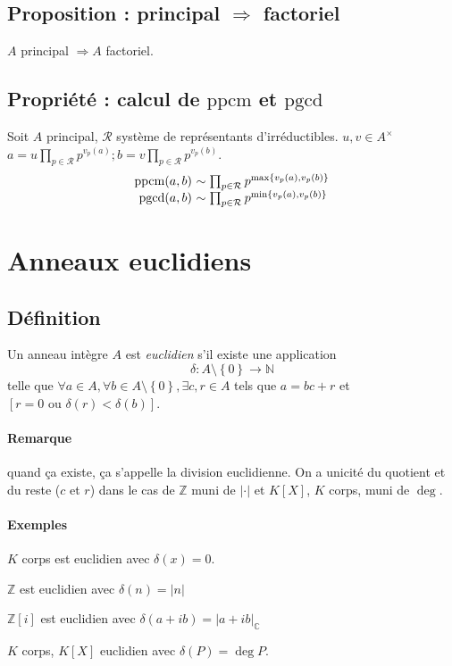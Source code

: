 \documentclass[reqno,a4paper,10pt]{report}
\makeatletter
\newcommand{\set}[1]{\left\lbrace #1 \right\rbrace} %
\newcommand{\IZ}{\ensuremath{\mathbb{Z}}\xspace} %
\newcommand{\IN}{\ensuremath{\mathbb{N}}\xspace} %
\newcommand{\IC}{\ensuremath{\mathbb{C}}\xspace} %
\newcommand{\so}{\Rightarrow}
\newcommand{\pgcd}{\mathrm{pgcd}} %
\newcommand{\ppcm}{\mathrm{ppcm}}
\newcommand{\ou}{\text{ ou }}
\let\olditemize=\itemize%
\renewenvironment{itemize}{%
    \olditemize%
  }{%
    \@noparlisttrue%
    \endlist%
  }%
\makeatother
\begin{document}
\subsection{Proposition : principal $\so$ factoriel}
$A$ principal $\so A$ factoriel.

\begin{comment}
  Preuve 02/12/09 p1
\end{comment}

\subsection{Propriété : calcul de $\ppcm$ et $\pgcd$}
Soit $A$ principal, $\mathcal R$ système de représentants d'irréductibles.
$u,v\in A^\times$\\
$\displaystyle a=u\prod_{p\in \mathcal R} p^{v_p(a)}; b=v\prod_{p\in \mathcal
R} p^{v_p(b)}$.
\[
\begin{array}{r@{\ }l}
  \ppcm(a,b) &\sim \prod_{p\in \mathcal R} p^{\max\set{v_p(a), v_p(b)}}\\
  \pgcd(a,b) &\sim \prod_{p\in \mathcal R} p^{\min\set{v_p(a), v_p(b)}}
\end{array}
\]

\section{Anneaux euclidiens}
\subsection{Définition}
Un anneau intègre $A$ est \emph{euclidien} s'il existe une application
\[\delta : A\setminus\set{0} \to \IN\]
telle que $\forall a\in A, \forall b \in A\setminus\set{0}, \exists c,r \in A$
tels que $a=bc+r$ et $\left[ r=0 \ou \delta(r) <\delta(b) \right]$.

\paragraph{Remarque}
quand ça existe, ça s'appelle la division euclidienne. On a unicité du
quotient et du reste ($c$ et $r$) dans le cas de $\IZ$ muni de $|\cdot|$
et $K[X]$, $K$ corps, muni de $\deg$.

\paragraph{Exemples}
\begin{itemize}
  \item $K$ corps est euclidien avec $\delta(x) = 0$.
  \item $\IZ$ est euclidien avec $\delta(n)=|n|$
  \item $\IZ[i]$ est euclidien avec $\delta(a+ib)=|a+ib|_{\IC}$
  \item $K$ corps, $K[X]$ euclidien avec $\delta(P)=\deg P$.
\end{itemize}
\end{document}
